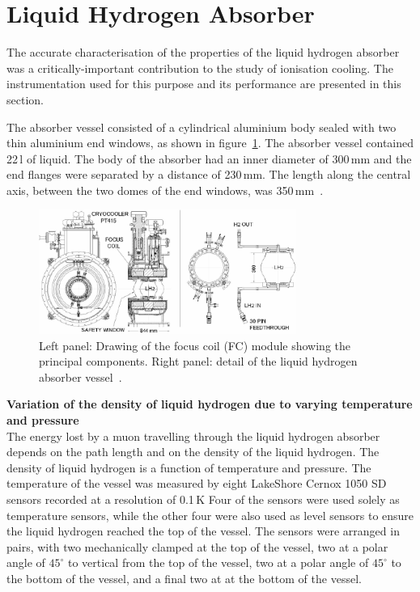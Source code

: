 \graphicspath{{07-Absorber/Figures/}}

\section{Liquid Hydrogen Absorber}
\label{Sect:Absorber}

The accurate characterisation of the properties of the liquid hydrogen
absorber was a critically-important contribution to the study of
ionisation cooling.
The instrumentation used for this purpose and its performance are
presented in this section.

The absorber vessel consisted of a cylindrical aluminium body sealed
with two thin aluminium end windows, as shown in
figure~\ref{Fig:AbsorberVessel:Diag}.
The absorber vessel contained 22\,l of liquid.
The body of the absorber had an inner diameter of 300\,mm and the end
flanges were separated by a distance of 230\,mm.  
The length along the central axis, between the
two domes of the end windows, was 350\,mm~\cite{1748-0221-13-09-T09008}. \\
\begin{figure}
  \begin{center}
    \includegraphics[width=0.75\textwidth]{AFC-drwng.pdf}
  \end{center}
  \caption{
    Left panel: Drawing of the focus coil (FC) module
    showing the principal components.
    Right panel: detail of the liquid hydrogen absorber vessel~\cite{1748-0221-13-09-T09008}.
  }
  \label{Fig:AbsorberVessel:Diag}
\end{figure}

\noindent\textbf{Variation of the density of liquid hydrogen due to
    varying temperature and pressure} \\
\noindent
The energy lost by a muon travelling through the liquid hydrogen
absorber depends on the path length and on
the density of the liquid hydrogen. The density of liquid hydrogen is
a function of temperature and pressure.  
The temperature of the vessel was measured by eight LakeShore Cernox
1050 SD sensors recorded at a resolution of 0.1\,K
Four of the sensors were used solely as temperature sensors, while the
other four were also used as level sensors to ensure the
liquid hydrogen reached the top of the vessel. 
The sensors were arranged in pairs, with two mechanically clamped at
the top of the vessel, two at a polar angle of ${45}^{\circ}$ to
vertical from the top of the vessel, two at a polar angle of
${45}^{\circ}$ to the bottom of the vessel, and a
final two at at the bottom of the vessel. 

